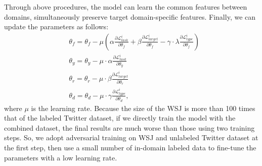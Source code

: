 \documentclass[11pt,letterpaper]{article}
\begin{document}
Through above procedures, the model can learn the common features between domains, simultaneously preserve target domain-specific features. Finally, we can update the parameters as follows:
\begin{equation}
\begin{aligned}
  &\theta_f = \theta_f - \mu(\alpha\frac{\partial \mathcal{L}_{task}^i}{\partial \theta_f}+\beta\frac{\partial \mathcal{L}_{target}^i}{\partial \theta_f}-\gamma\cdot\lambda \frac{\partial \mathcal{L}^i_{type}}{\partial \theta_f})\\
  &\theta_y= \theta_y-\mu\cdot\alpha \frac{\partial \mathcal{L}^i_{task}}{\partial \theta_y}\\
  &\theta_r= \theta_r-\mu\cdot\beta \frac{\partial \mathcal{L}^i_{target}}{\partial \theta_r}\\
  &\theta_d= \theta_d-\mu\cdot\gamma\frac{\partial \mathcal{L}^i_{type}}{\partial \theta_d},
\end{aligned} \label{eq:fyd}
\end{equation}
where $\mu$ is the learning rate. Because the size of the WSJ is more than 100 times that of the labeled Twitter dataset, if we directly train the model with the combined dataset, the final results are much worse than those using two training steps. So, we adopt adversarial training on WSJ and unlabeled Twitter dataset at the first step, then use a small number of in-domain labeled data to fine-tune the parameters with a low learning rate. 




\end{document}
